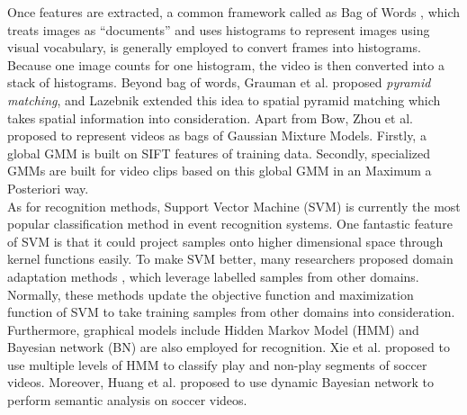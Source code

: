 \noindent Once features are extracted, a common framework called as Bag of Words \cite{sivic2003video}, which treats images as ``documents'' and uses histograms to represent images using visual vocabulary, is generally employed to convert frames into histograms. Because one image counts for one histogram, the video is then converted into a stack of histograms. Beyond bag of words, Grauman et al. \cite{grauman2005pyramid} proposed {\em pyramid matching}, and Lazebnik extended this idea to spatial pyramid matching \cite{lazebnik2006beyond} which takes spatial information into consideration. Apart from Bow, Zhou et al. \cite{zhou2008sift} proposed to represent videos as bags of Gaussian Mixture Models. Firstly, a global GMM is built on SIFT features of training data. Secondly, specialized GMMs are built for video clips based on this global GMM in an Maximum a Posteriori way. \\

\noindent As for recognition methods, Support Vector Machine (SVM) \cite{boser1992training} is currently the most popular classification method in event recognition systems. One fantastic feature of SVM is that it could project samples onto higher dimensional space through kernel functions easily. To make SVM better, many researchers proposed domain adaptation methods \cite{daume2007frustratingly, yang2007cross, duan2009domain, duan2012visual}, which leverage labelled samples from other domains. Normally, these methods update the objective function and maximization function of SVM to take training samples from other domains into consideration. Furthermore, graphical models include Hidden Markov Model (HMM) and Bayesian network (BN) are also employed for recognition.  Xie et al. \cite{xie2002structure} proposed to use multiple levels of HMM to classify play and non-play segments of soccer videos. Moreover, Huang et al. \cite{huang2006semantic} proposed to use dynamic Bayesian network to perform semantic analysis on soccer videos. 